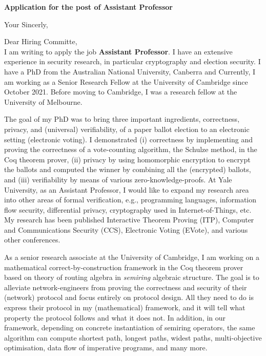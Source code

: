 \documentclass[11pt,a4paper,roman]{moderncv}
\begin{document}
\date{}
\opening{\textbf{Application for the post of Assistant Professor}}
\closing{Your Sincerly, \vspace{-1em}}



\makelettertitle



Dear Hiring Committe, 
\\
\vspace{1em}
I am writing to apply
the job \textbf{Assistant Professor}. 
I have an extensive experience in
security research, in particular cryptography and election security. 
I have a PhD from the Australian National University, Canberra
and Currently, I am working as a Senior Research Fellow at the University of 
Cambridge since October 2021. Before moving to Cambridge, I was a 
research fellow at the University of Melbourne. 

\vspace{0.5cm}
The goal of my PhD was to 
bring  three important ingredients, correctness, privacy, and (universal) verifiability, of a 
paper ballot election to an electronic setting (electronic voting). I 
demonstrated (i) correctness by implementing and proving the correctness of 
a vote-counting algorithm, the Schulze method, in the Coq theorem prover, 
(ii) privacy by using homomorphic encryption to encrypt the ballots and computed
the winner by combining all the (encrypted) ballots, and 
(iii) verifiability by means of various zero-knowledge-proofs.
At Yale University, as an Assistant Professor, 
I would like to expand my research area into other areas of formal verification, 
e.g., programming languages, information flow security, 
differential privacy,  cryptography used in Internet-of-Things,
etc. My research has been published Interactive Theorem Proving (ITP), 
Computer and Communications Security (CCS), Electronic Voting (EVote), 
and various other conferences. 

 

\vspace{0.5cm}
As a senior research associate at the University of Cambridge, 
I am working on  
a mathematical correct-by-construction framework in the Coq theorem prover 
based on theory of routing algebra in \emph{semiring} algebraic structure.
The goal is to alleviate network-engineers from proving the 
correctness and security of their (network) protocol and focus entirely on protocol design.
All  they need to do is express their protocol in my (mathematical) 
framework, and it will 
tell what property the protocol follows and what it does not. 
In addition, in our framework, depending on concrete instantiation 
of semiring operators, the same algorithm can compute shortest path, longest paths, 
widest paths, multi-objective optimisation, data flow of imperative programs, and many more. 
\end{document}
